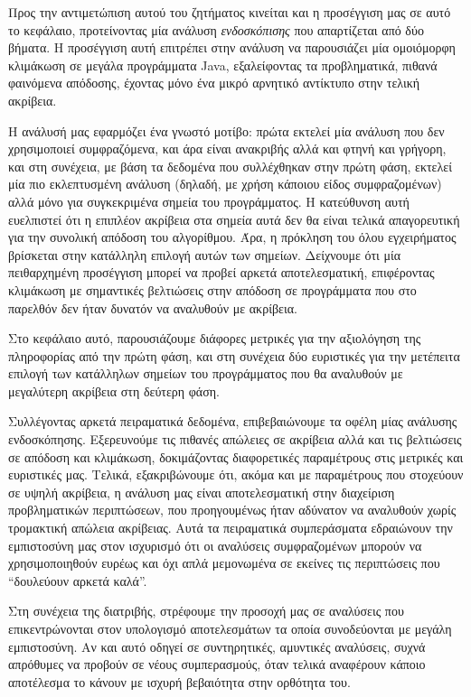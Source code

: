 Προς την αντιμετώπιση αυτού του ζητήματος κινείται και η προσέγγιση μας σε αυτό το κεφάλαιο, προτείνοντας μία ανάλυση \emph{ενδοσκόπισης} που απαρτίζεται από δύο βήματα. Η προσέγγιση αυτή επιτρέπει στην ανάλυση να παρουσιάζει μία ομοιόμορφη κλιμάκωση σε μεγάλα προγράμματα {\en Java}, εξαλείφοντας τα προβληματικά, πιθανά φαινόμενα απόδοσης, έχοντας μόνο ένα μικρό αρνητικό αντίκτυπο στην τελική ακρίβεια.

Η ανάλυσή μας εφαρμόζει ένα γνωστό μοτίβο: πρώτα εκτελεί μία ανάλυση που δεν χρησιμοποιεί συμφραζόμενα, και άρα είναι ανακριβής αλλά και φτηνή και γρήγορη, και στη συνέχεια, με βάση τα δεδομένα που συλλέχθηκαν στην πρώτη φάση, εκτελεί μία πιο εκλεπτυσμένη ανάλυση (δηλαδή, με χρήση κάποιου είδος συμφραζομένων) αλλά μόνο για συγκεκριμένα σημεία του προγράμματος. Η κατεύθυνση αυτή ευελπιστεί ότι η επιπλέον ακρίβεια στα σημεία αυτά δεν θα είναι τελικά απαγορευτική για την συνολική απόδοση του αλγορίθμου. Άρα, η πρόκληση του όλου εγχειρήματος βρίσκεται στην κατάλληλη επιλογή αυτών των σημείων. Δείχνουμε ότι μία πειθαρχημένη προσέγγιση μπορεί να προβεί αρκετά αποτελεσματική, επιφέροντας κλιμάκωση με σημαντικές βελτιώσεις στην απόδοση σε προγράμματα που στο παρελθόν δεν ήταν δυνατόν να αναλυθούν με ακρίβεια.

Στο κεφάλαιο αυτό, παρουσιάζουμε διάφορες μετρικές για την αξιολόγηση της πληροφορίας από την πρώτη φάση, και στη συνέχεια δύο ευριστικές για την μετέπειτα επιλογή των κατάλληλων σημείων του προγράμματος που θα αναλυθούν με μεγαλύτερη ακρίβεια στη δεύτερη φάση.

Συλλέγοντας αρκετά πειραματικά δεδομένα, επιβεβαιώνουμε τα οφέλη μίας ανάλυσης ενδοσκόπησης. Εξερευνούμε τις πιθανές απώλειες σε ακρίβεια αλλά και τις βελτιώσεις σε απόδοση και κλιμάκωση, δοκιμάζοντας διαφορετικές παραμέτρους στις μετρικές και ευριστικές μας. Τελικά, εξακριβώνουμε ότι, ακόμα και με παραμέτρους που στοχεύουν σε υψηλή ακρίβεια, η ανάλυση μας είναι αποτελεσματική στην διαχείριση προβληματικών περιπτώσεων, που προηγουμένως ήταν αδύνατον να αναλυθούν χωρίς τρομακτική απώλεια ακρίβειας. Αυτά τα πειραματικά συμπεράσματα εδραιώνουν την εμπιστοσύνη μας στον ισχυρισμό ότι οι αναλύσεις συμφραζομένων μπορούν να χρησιμοποιηθούν ευρέως και όχι απλά μεμονωμένα σε εκείνες τις περιπτώσεις που ``δουλεύουν αρκετά καλά''.


\vspace{5 mm}
Στη συνέχεια της διατριβής, στρέφουμε την προσοχή μας σε αναλύσεις που επικεντρώνονται στον υπολογισμό αποτελεσμάτων τα οποία συνοδεύονται με μεγάλη εμπιστοσύνη. Αν και αυτό οδηγεί σε συντηρητικές, αμυντικές αναλύσεις, συχνά απρόθυμες να προβούν σε νέους συμπερασμούς, όταν τελικά αναφέρουν κάποιο αποτέλεσμα το κάνουν με ισχυρή βεβαιότητα στην ορθότητα του.


